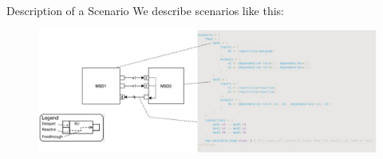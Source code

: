 \documentclass{beamer}
\begin{document}
\begin{frame}{Description of a Scenario}
    We describe scenarios like this:
    \begin{figure}
        \includegraphics[width=1\textwidth]{images/scenario-generation.jpg}
    \end{figure}
\end{frame}
\end{document}
